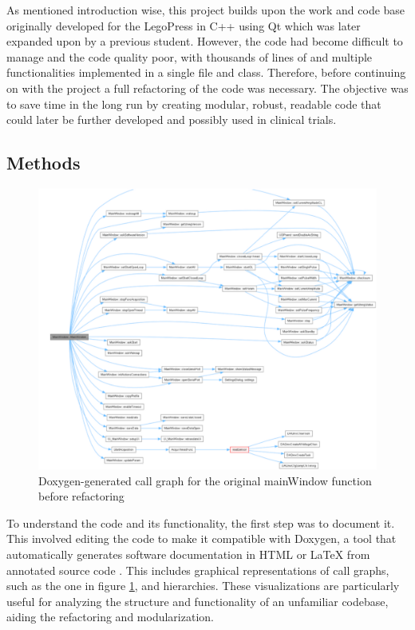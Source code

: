

As mentioned introduction wise, this project builds upon the work and code base originally developed for the LegoPress \cite{olivier_legopress_2014} in C++ using Qt which was later expanded upon by a previous student. However, the code had become difficult to manage and the code quality poor, with thousands of lines of and multiple functionalities implemented in a single file and class. Therefore, before continuing on with the project a full refactoring of the code was necessary. The objective was to save time in the long run by creating modular, robust, readable code that could later be further developed and possibly used in clinical trials.

\subsection{Methods}
\begin{figure} [h]
	\centering
	\includegraphics[width=0.9\linewidth]{images/oldDoxy.png}
	\caption{Doxygen-generated call graph for the original mainWindow function before refactoring}
	\label{fig:oldDoxy}
\end{figure}

To understand the code and its functionality, the first step was to document it. This involved editing the code to make it compatible with Doxygen, a tool that automatically generates software documentation in HTML or LaTeX from annotated source code \cite{noauthor_doxygen_nodate}. This includes graphical representations of call graphs, such as the one in figure \ref{fig:oldDoxy}, and hierarchies. These visualizations are particularly useful for analyzing the structure and functionality of an unfamiliar codebase, aiding the refactoring and modularization.

